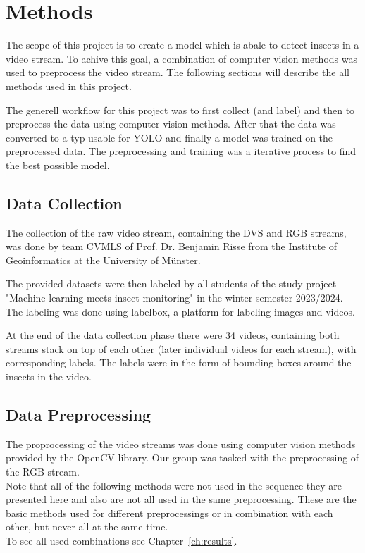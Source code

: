 \chapter{Methods}
\label{ch:methods}



The scope of this project is to create a model which is abale to detect insects in a video stream. To achive this goal, a combination of computer vision methods was used to preprocess the video stream. The following sections will describe the all methods used in this project.

The generell workflow for this project was to first collect (and label) and then to preprocess the data using computer vision methods. After that the data was converted to a typ usable for YOLO and finally a model was trained on the preprocessed data. The preprocessing and training was a iterative process to find the best possible model.

\section{Data Collection}

The collection of the raw video stream, containing the DVS and RGB streams, was done by team CVMLS of Prof. Dr. Benjamin Risse from the Institute of Geoinformatics at the University of Münster.

The provided datasets were then labeled by all students of the study project "Machine learning meets insect monitoring" in the winter semester 2023/2024. The labeling was done using labelbox, a platform for labeling images and videos. 

At the end of the data collection phase there were 34 videos, containing both streams stack on top of each other (later individual videos for each stream), with corresponding labels. The labels were in the form of bounding boxes around the insects in the video.

\section{Data Preprocessing}

The proprocessing of the video streams was done using computer vision methods provided by the OpenCV library. Our group was tasked with the preprocessing of the RGB stream.\\
Note that all of the following methods were not used in the sequence they are presented here and also are not all used in the same preprocessing. These are the basic methods used for different preprocessings or in combination with each other, but never all at the same time.\\
To see all used combinations see Chapter~\ref{ch:results}.

